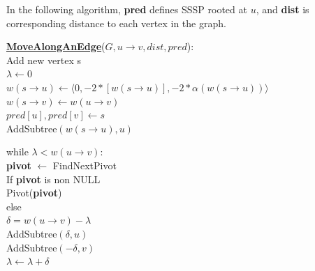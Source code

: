 \documentclass{article}
\begin{document}
In the following algorithm, \textbf{pred} defines SSSP rooted at $u$, and 
\textbf{dist} is corresponding distance to each vertex in the graph.


\begin{algorithm}
\textbf{\underline{MoveAlongAnEdge}}($G, u \rightarrow v, dist, pred$): \\ \quad
Add new vertex s \\ \quad
$\lambda \leftarrow 0$ \\ \quad
$w(s \rightarrow u) \leftarrow \langle 0, -2 * [w(s \rightarrow u)], 
-2 * \alpha(w(s \rightarrow u)) \rangle$ \\ \quad
$w(s \rightarrow v) \leftarrow w(u \rightarrow v)$ \\ \quad
$pred[u], pred[v] \leftarrow s$ \\ \quad
AddSubtree$(w(s \rightarrow u), u)$ \\ \quad

while $\lambda < w(u \rightarrow v)$: \\ \quad \quad
    \textbf{pivot} $\leftarrow $ FindNextPivot \\ \quad \quad
    If \textbf{pivot} is non NULL \\ \qquad \quad
        Pivot(\textbf{pivot}) \\ \quad \quad
    else \\ \qquad \quad
        $\delta = w(u \rightarrow v) - \lambda$ \\ \qquad \quad
        AddSubtree$(\delta, u)$ \\ \qquad \quad
        AddSubtree$(-\delta, v)$ \\ \qquad \quad
        $\lambda \leftarrow \lambda + \delta$ \\
\end{algorithm}
\end{document}

